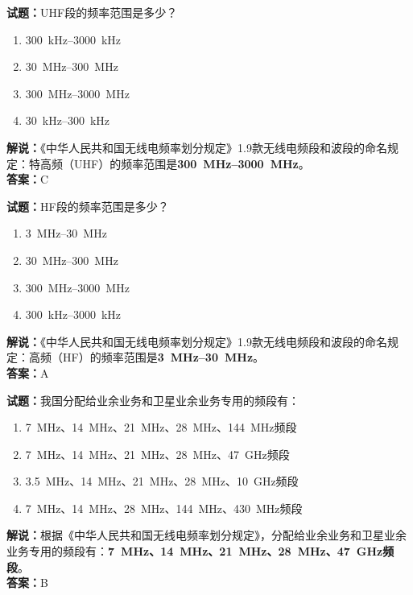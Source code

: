 \documentclass{ctexbook}
\begin{document}
\bigskip

\noindent\textbf{试题：}UHF段的频率范围是多少？
\begin{enumerate}[leftmargin=3em]
  \item \qtyrange[range-phrase=\mbox{到}]{300}{3000}{\kHz}
  \item \qtyrange[range-phrase=\mbox{到}]{30}{300}{\MHz}
  \item \qtyrange[range-phrase=\mbox{到}]{300}{3000}{\MHz}
  \item \qtyrange[range-phrase=\mbox{到}]{30}{300}{\kHz}
\end{enumerate}
\noindent\textbf{解说：}《中华人民共和国无线电频率划分规定》1.9款无线电频段和波段的命名规定：特高频（UHF）的频率范围是\textbf{\qtyrange[range-phrase=\mbox{到}]{300}{3000}{\MHz}}。\\\noindent\textbf{答案：}C

\bigskip

\noindent\textbf{试题：}HF段的频率范围是多少？
\begin{enumerate}[leftmargin=3em]
  \item \qtyrange[range-phrase=\mbox{到}]{3}{30}{\MHz}
  \item \qtyrange[range-phrase=\mbox{到}]{30}{300}{\MHz}
  \item \qtyrange[range-phrase=\mbox{到}]{300}{3000}{\MHz}%
  \item \qtyrange[range-phrase=\mbox{到}]{300}{3000}{\kHz}%
\end{enumerate}
\noindent\textbf{解说：}《中华人民共和国无线电频率划分规定》1.9款无线电频段和波段的命名规定：高频（HF）的频率范围是\textbf{\qtyrange[range-phrase=\mbox{到}]{3}{30}{\MHz}}。\\\noindent\textbf{答案：}A

\bigskip

\noindent\textbf{试题：}我国分配给业余业务和卫星业余业务专用的频段有：
\begin{enumerate}[leftmargin=3em]
  \item \qty{7}{\MHz}、\qty{14}{\MHz}、\qty{21}{\MHz}、\qty{28}{\MHz}、\qty{144}{\MHz}频段
  \item \qty{7}{\MHz}、\qty{14}{\MHz}、\qty{21}{\MHz}、\qty{28}{\MHz}、\qty{47}{\GHz}频段
  \item \qty{3.5}{\MHz}、\qty{14}{\MHz}、\qty{21}{\MHz}、\qty{28}{\MHz}、\qty{10}{\GHz}频段
  \item \qty{7}{\MHz}、\qty{14}{\MHz}、\qty{28}{\MHz}、\qty{144}{\MHz}、\qty{430}{\MHz}频段
\end{enumerate}
\noindent\textbf{解说：}根据《中华人民共和国无线电频率划分规定》，分配给业余业务和卫星业余业务专用的频段有：\textbf{\qty{7}{\MHz}、\qty{14}{\MHz}、\qty{21}{\MHz}、\qty{28}{\MHz}、\qty{47}{\GHz}频段}。\\\noindent\textbf{答案：}B
\end{document}
